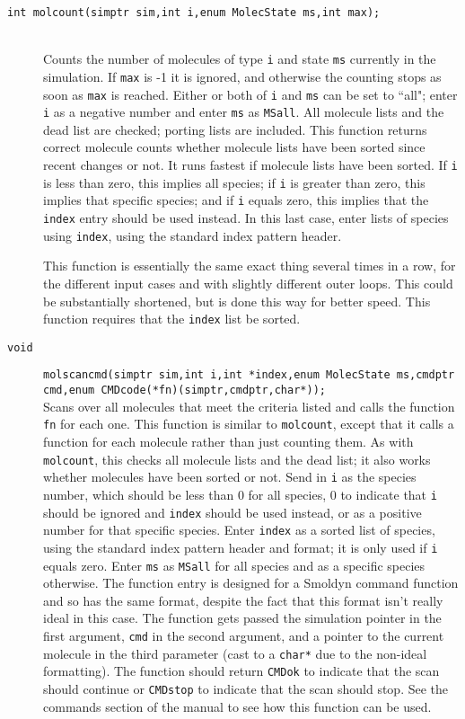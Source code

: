 \documentclass {scrbook}
\newcommand {\ttt} {\texttt}
\begin{document}
\begin{description}
\item[\ttt{int molcount(simptr sim,int i,enum MolecState ms,int max);}]
\hfill \\
Counts the number of molecules of type \ttt{i} and state \ttt{ms} currently in the simulation. If \ttt{max} is -1 it is ignored, and otherwise the counting stops as soon as \ttt{max} is reached. Either or both of \ttt{i} and \ttt{ms} can be set to ``all"; enter \ttt{i} as a negative number and enter \ttt{ms} as \ttt{MSall}. All molecule lists and the dead list are checked; porting lists are included. This function returns correct molecule counts whether molecule lists have been sorted since recent changes or not. It runs fastest if molecule lists have been sorted. If \ttt{i} is less than zero, this implies all species; if \ttt{i} is greater than zero, this implies that specific species; and if \ttt{i} equals zero, this implies that the \ttt{index} entry should be used instead. In this last case, enter lists of species using \ttt{index}, using the standard index pattern header.

This function is essentially the same exact thing several times in a row, for the different input cases and with slightly different outer loops. This could be substantially shortened, but is done this way for better speed. This function requires that the \ttt{index} list be sorted.

\item[\ttt{void}]
\ttt{molscancmd(simptr sim,int i,int *index,enum MolecState ms,cmdptr cmd,enum CMDcode(*fn)(simptr,cmdptr,char*));}
\hfill \\
Scans over all molecules that meet the criteria listed and calls the function \ttt{fn} for each one. This function is similar to \ttt{molcount}, except that it calls a function for each molecule rather than just counting them. As with \ttt{molcount}, this checks all molecule lists and the dead list; it also works whether molecules have been sorted or not. Send in \ttt{i} as the species number, which should be less than 0 for all species, 0 to indicate that \ttt{i} should be ignored and \ttt{index} should be used instead, or as a positive number for that specific species. Enter \ttt{index} as a sorted list of species, using the standard index pattern header and format; it is only used if \ttt{i} equals zero. Enter \ttt{ms} as \ttt{MSall} for all species and as a specific species otherwise. The function entry is designed for a Smoldyn command function and so has the same format, despite the fact that this format isn't really ideal in this case. The function gets passed the simulation pointer in the first argument, \ttt{cmd} in the second argument, and a pointer to the current molecule in the third parameter (cast to a \ttt{char*} due to the non-ideal formatting). The function should return \ttt{CMDok} to indicate that the scan should continue or \ttt{CMDstop} to indicate that the scan should stop. See the commands section of the manual to see how this function can be used.


\end{description}
\end{document}
